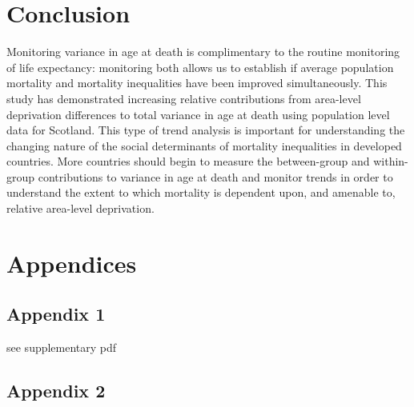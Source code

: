 \documentclass[12pt,oneside,a4paper]{article} %
\theoremstyle{definition}
\begin{document}
\section{Conclusion}
Monitoring variance in age at death is complimentary to the routine monitoring of life expectancy: monitoring both allows us to establish if average population mortality and mortality inequalities have been improved simultaneously. This study has demonstrated increasing relative contributions from area-level deprivation differences to total variance in age at death using population level data for Scotland. This type of trend analysis is important for understanding the changing nature of the social determinants of mortality inequalities in developed countries.  More countries should begin to measure the between-group and within-group contributions to variance in age at death and monitor trends in order to understand the extent to which mortality is dependent upon, and amenable to, relative area-level deprivation.





\section{Appendices}

\subsection{Appendix 1}
see supplementary pdf


\subsection{Appendix 2}
\end{document}
